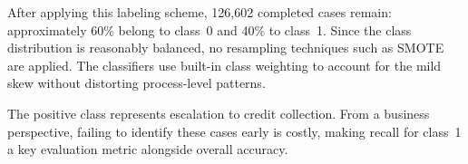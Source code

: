 After applying this labeling scheme, 126,602 completed cases remain: approximately 60\% belong to class~0 and 40\% to class~1. Since the class distribution is reasonably balanced, no resampling techniques such as SMOTE are applied. The classifiers use built-in class weighting to account for the mild skew without distorting process-level patterns.

The positive class represents escalation to credit collection. From a business perspective, failing to identify these cases early is costly, making recall for class~1 a key evaluation metric alongside overall accuracy.
